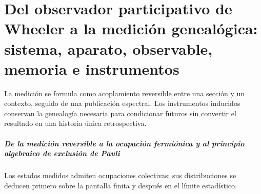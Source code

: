 \chapter{Del observador participativo de Wheeler a la medición genealógica: sistema, aparato, observable, memoria e instrumentos}
\label{chap:parte-iv-54}

La medición se formula como acoplamiento reversible entre una sección y un contexto, seguido de una publicación espectral. Los instrumentos inducidos conservan la genealogía necesaria para condicionar futuros sin convertir el resultado en una historia única retrospectiva.





\paragraph{De la medición reversible a la ocupación fermiónica y al principio algebraico de exclusión de Pauli} Los estados medidos admiten ocupaciones colectivas; sus distribuciones se deducen primero sobre la pantalla finita y después en el límite estadístico.
